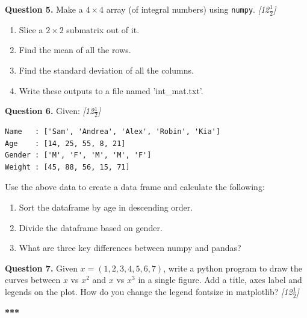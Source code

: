 \documentclass[11pt,a4paper]{article}
\newcommand{\pts}[1]{\hfill \textit{[#1]}}
\begin{document}
\bigskip

\noindent \textbf{Question 5.} Make a $4 \times 4$ array (of integral numbers) using \texttt{numpy}. \pts{12$\frac{1}{2}$}
\begin{enumerate}[label=(\alph*)]
  \item Slice a $2 \times 2$ submatrix out of it.
  \item Find the mean of all the rows.
  \item Find the standard deviation of all the columns.
  \item Write these outputs to a file named 'int\_mat.txt'.
\end{enumerate}

\bigskip

\noindent \textbf{Question 6.} Given: \pts{12$\frac{1}{2}$}
\begin{lstlisting}
Name   : ['Sam', 'Andrea', 'Alex', 'Robin', 'Kia']
Age    : [14, 25, 55, 8, 21]
Gender : ['M', 'F', 'M', 'M', 'F']
Weight : [45, 88, 56, 15, 71]
\end{lstlisting}
Use the above data to create a data frame and calculate the following:
\begin{enumerate}[label=(\alph*)]
  \item Sort the dataframe by age in descending order.
  \item Divide the dataframe based on gender.
  \item What are three key differences between numpy and pandas?
\end{enumerate}

\bigskip

\noindent \textbf{Question 7.} Given $x = (1, 2, 3, 4, 5, 6, 7)$, write a python program to draw the curves between $x$ vs $x^2$ and $x$ vs $x^3$ in a single figure. Add a title, axes label and legends on the plot. How do you change the legend fontsize in matplotlib? \pts{12$\frac{1}{2}$}

\bigskip
\begin{center}
  \textbf{***}
\end{center}
\end{document}
